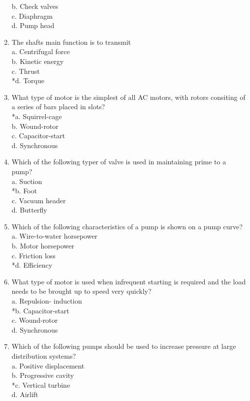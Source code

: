 \begin{enumerate}[1.]
b. Check valves\\
c. Diaphragm\\
d. Pump head
\item The shafts main function is to transmit   \\
a.  Centrifugal force\\
b.  Kinetic energy\\
c.  Thrust\\
*d.  Torque\\
\item What type of motor is the simplest of all AC motors, with rotors consiting of a series of bars placed in slots?\\
*a. Squirrel-cage\\
b. Wound-rotor\\
c. Capacitor-start\\
d. Synchronous\\
\item Which of the following typer of valve is used in maintaining prime to a pump?\\
a. Suction\\
*b. Foot\\
c. Vacuum header\\
d. Butterfly\\
\item Which of the following characteristics of a pump is shown on a pump curve?\\
a. Wire-to-water horsepower\\
b. Motor horsepower\\
c. Friction loss\\
*d. Efficiency\\
\item What type of motor is used when infrequent starting is required and the load needs to be brought up to speed very quickly?\\
a. Repulsion- induction\\
*b. Capacitor-start\\
c. Wound-rotor\\
d. Synchronous\\
\item Which of the following pumps should be used to increase pressure at large distribution systems?\\
a. Positive displacement\\
b. Progressive cavity\\
*c. Vertical turbine\\
d. Airlift\\

\end{enumerate}
